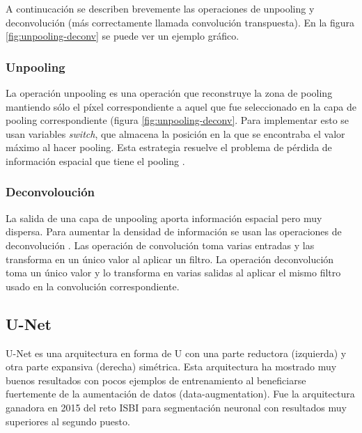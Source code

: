 
A continucación se describen brevemente las operaciones de unpooling y deconvolución (más correctamente llamada convolución transpuesta). En la figura \ref{fig:unpooling-deconv} \cite{Noh2015} se puede ver un ejemplo gráfico.

\subsubsection{Unpooling}

La operación unpooling es una operación que reconstruye la zona de pooling mantiendo sólo el píxel correspondiente a aquel que fue seleccionado en la capa de pooling correspondiente (figura \ref{fig:unpooling-deconv}. Para implementar esto se usan variables \textit{switch}, que almacena la posición en la que se encontraba el valor máximo al hacer pooling. Esta estrategia resuelve el problema de pérdida de información espacial que tiene el pooling \cite{Zeiler2011}.

\subsubsection{Deconvoloución}

La salida de una capa de unpooling aporta información espacial pero muy dispersa. Para aumentar la densidad de información se usan las operaciones de deconvolución \cite{Noh2015}. Las operación de convolución toma varias entradas y las transforma en un único valor al aplicar un filtro. La operación deconvolución toma un único valor y lo transforma en varias salidas al aplicar el mismo filtro usado en la convolución correspondiente.


\subsection{U-Net}

U-Net es una arquitectura en forma de U con una parte reductora (izquierda) y otra parte expansiva (derecha) simétrica. Esta arquitectura ha mostrado muy buenos resultados con pocos ejemplos de entrenamiento al beneficiarse fuertemente de la aumentación de datos (data-augmentation)\cite{Ronneberger2015}. Fue la arquitectura ganadora en 2015 del reto ISBI para segmentación neuronal con resultados muy superiores al segundo puesto. 

